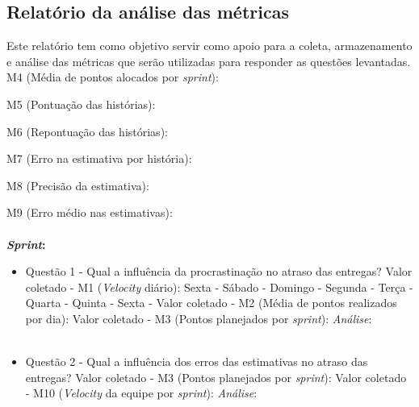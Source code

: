 \begin{apendicesenv}
	      
	\chapter{Relatório da análise das métricas}
	
	Este relatório tem como objetivo servir como apoio para a coleta, armazenamento e análise das métricas que serão 
	utilizadas para responder as questões levantadas.
	\\
	

	M4 (Média de pontos alocados por \textit{sprint}): \underline{ }\underline{ }\underline{ }
	
	M5 (Pontuação das histórias):  \underline{ }\underline{ }\underline{ }
	
	M6 (Repontuação das histórias): \underline{ }\underline{ }\underline{ }
	
	M7 (Erro na estimativa por história): \underline{ }\underline{ }\underline{ }
	
	M8 (Precisão da estimativa): \underline{ }\underline{ }\underline{ }
	
	M9 (Erro médio nas estimativas): \underline{ }\underline{ }\underline{ }
	\\
	\\
	\textbf{\textit{Sprint}: \underline{ }\underline{ }\underline{ }}
	
	\begin{itemize}
	  
	  \item Questão 1 - Qual a influência da procrastinação no atraso das entregas?
	    \subitem Valor coletado - M1 (\textit{Velocity} diário):
	      \subsubitem Sexta -
	      \subsubitem Sábado -
	      \subsubitem Domingo -
	      \subsubitem Segunda -
	      \subsubitem Terça -
	      \subsubitem Quarta -
	      \subsubitem Quinta -
	      \subsubitem Sexta - 
	    \subitem Valor coletado - M2 (Média de pontos realizados por dia): 
	    \subitem Valor coletado - M3 (Pontos planejados por \textit{sprint}):
	    \subitem \textit{Análise}:
	    \\
	    \\
	    \vfill
	    \pagebreak

	  \item Questão 2 - Qual a influência dos erros das estimativas no atraso das entregas? 
	    \subitem Valor coletado - M3 (Pontos planejados por \textit{sprint}):
	    \subitem Valor coletado - M10 (\textit{Velocity} da equipe por \textit{sprint}):
	    \subitem \textit{Análise}:
	    \\
	    \\
	    

\end{itemize}
\end{apendicesenv}
